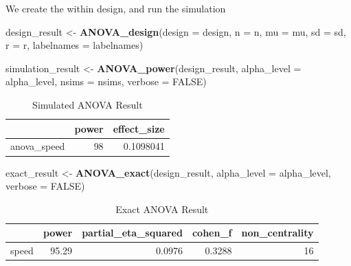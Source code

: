 \documentclass[]{book}
\newenvironment{Shaded}{\begin{snugshade}}{\end{snugshade}}
\newcommand{\DataTypeTok}[1]{\textcolor[rgb]{0.13,0.29,0.53}{#1}}
\newcommand{\KeywordTok}[1]{\textcolor[rgb]{0.13,0.29,0.53}{\textbf{#1}}}
\newcommand{\NormalTok}[1]{#1}
\newcommand{\OtherTok}[1]{\textcolor[rgb]{0.56,0.35,0.01}{#1}}
\newcommand{\StringTok}[1]{\textcolor[rgb]{0.31,0.60,0.02}{#1}}
\begin{document}
We create the within design, and run the simulation

\begin{Shaded}
\begin{Highlighting}[]
\NormalTok{design_result <-}\StringTok{ }\KeywordTok{ANOVA_design}\NormalTok{(}\DataTypeTok{design =}\NormalTok{ design,}
                   \DataTypeTok{n =}\NormalTok{ n, }
                   \DataTypeTok{mu =}\NormalTok{ mu, }
                   \DataTypeTok{sd =}\NormalTok{ sd, }
                   \DataTypeTok{r =}\NormalTok{ r, }
                   \DataTypeTok{labelnames =}\NormalTok{ labelnames)}

\NormalTok{simulation_result <-}\StringTok{ }\KeywordTok{ANOVA_power}\NormalTok{(design_result, }
                                 \DataTypeTok{alpha_level =}\NormalTok{ alpha_level, }
                                 \DataTypeTok{nsims =}\NormalTok{ nsims,}
                                 \DataTypeTok{verbose =} \OtherTok{FALSE}\NormalTok{)}
\end{Highlighting}
\end{Shaded}

\begin{table}[t]

\caption{\label{tab:unnamed-chunk-88}Simulated ANOVA Result}
\centering
\begin{tabular}{l|r|r}
\hline
  & power & effect\_size\\
\hline
anova\_speed & 98 & 0.1098041\\
\hline
\end{tabular}
\end{table}

\begin{Shaded}
\begin{Highlighting}[]
\NormalTok{exact_result <-}\StringTok{ }\KeywordTok{ANOVA_exact}\NormalTok{(design_result,}
                            \DataTypeTok{alpha_level =}\NormalTok{ alpha_level,}
                            \DataTypeTok{verbose =} \OtherTok{FALSE}\NormalTok{)}
\end{Highlighting}
\end{Shaded}

\begin{table}[t]

\caption{\label{tab:unnamed-chunk-90}Exact ANOVA Result}
\centering
\begin{tabular}{l|r|r|r|r}
\hline
  & power & partial\_eta\_squared & cohen\_f & non\_centrality\\
\hline
speed & 95.29 & 0.0976 & 0.3288 & 16\\
\hline
\end{tabular}
\end{table}
\end{document}
